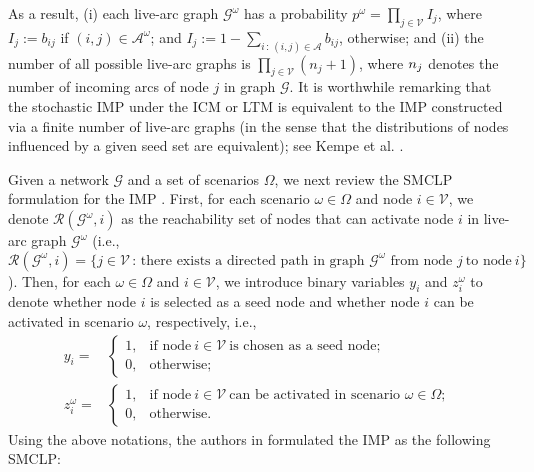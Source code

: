 \documentclass[a4paper,10pt]{article}
\theoremstyle{plain}
\newcommand{\rev}[1]{{\color{black}#1}}
\newcommand{\revv}[1]{{#1}}
\begin{document}
	As a result, (i) each live-arc graph $\mathcal{G}^{\omega}$ has a probability $p^{\omega}=\prod_{j\in\mathcal{V}}I_j$, where $I_j:=b_{ij}$ if  $(i,j)\in\mathcal{A}^{\omega}$; 
	and $I_j :=1-\sum_{i\,:\,(i,j)\in\mathcal{A}}b_{ij}$, otherwise; and (ii) the number of all possible live-arc graphs is $\prod_{\revv{j} \in \mathcal{V}} \revv{(n_j+1)}$, where $\rev{n_j}$ denotes the number of incoming arcs of node \revv{$j$} in graph $\mathcal{G}$.
	It is worthwhile remarking that the stochastic IMP under the ICM or LTM  is equivalent to the IMP constructed via a finite number of live-arc graphs (in the sense that the distributions of nodes influenced by a given seed set are equivalent); see Kempe et al. \cite{Kempe2003}.
	
	
	Given a \revv{network} $\mathcal{G}$ and a set of scenarios $\Omega$, we next review the SMCLP formulation for the IMP \cite{Guney2019,Guney2020,Li2019}.
	First, for each scenario $\omega\in\Omega$ and node $i\in\mathcal{V}$, we denote $\mathcal{R}(\mathcal{G}^{\omega},i)$ as the reachability set of nodes that can activate node $i$ in live-arc graph $\mathcal{G}^{\omega}$ (i.e., \revv{$\mathcal{R}(\mathcal{G}^{\omega},i)=\{j\in\mathcal{V}\,:\,\text{there~exists~a~directed~path~in~graph~$\mathcal{G}^{\omega}$~from~node~}j~\text{to~node}~i\}$}).
	Then, for each $\omega\in\Omega$ and $i\in\mathcal{V}$, we introduce binary variables $y_i$ and $z_i^{\omega}$ to denote whether node $i$ is selected as a seed node and whether node $i$ can be activated in scenario $\omega$, respectively, i.e., 
	\begin{equation*}
		\begin{aligned}
			y_i =&\left\{\begin{array}{ll}1,
				& {\text{if~node}}~ i\in\mathcal{V} ~{\text{is chosen as a seed node}};~\\
				0,& {\text{otherwise;}}\end{array}\right.\\
			z_i^{\omega} =&\left\{\begin{array}{ll}1,
				& {\text{if~node}}~ i\in\mathcal{V} ~{\text{can be activated in scenario }}\omega\in\Omega;~\\
				0,& {\text{otherwise}}.\end{array}\right.
		\end{aligned}
	\end{equation*}
	Using the above notations, the authors in \cite{Guney2019,Guney2020,Li2019} formulated the IMP as the following SMCLP:
\end{document}

